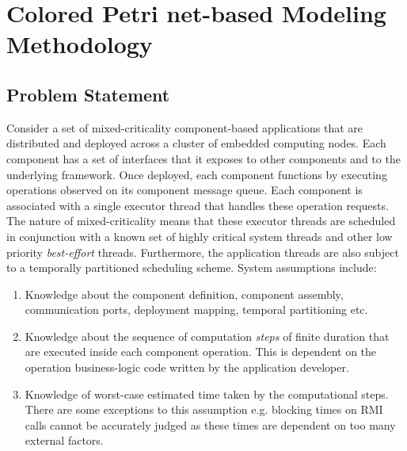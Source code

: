 \chapter{Colored Petri net-based Modeling Methodology}
\label{chapter:modeling}

\section{Problem Statement}

Consider a set of mixed-criticality component-based applications that are distributed and deployed across a cluster of embedded computing nodes. Each component has a set of interfaces that it exposes to other components and to the underlying framework. Once deployed, each component functions by executing operations observed on its component message queue. Each component is associated with a single executor thread that handles these operation requests. The nature of mixed-criticality means that these executor threads are scheduled in conjunction with a known set of highly critical system threads and other low priority \emph{best-effort} threads. Furthermore, the application threads are also subject to a temporally partitioned scheduling scheme. System assumptions include:

\begin{enumerate}
	\item Knowledge about the component definition, component assembly, communication ports, deployment mapping, temporal partitioning etc. 
	
	\item Knowledge about the sequence of computation \emph{steps} of finite duration that are executed inside each component operation. This is dependent on the operation business-logic code written by the application developer.
	
	\item Knowledge of worst-case estimated time taken by the computational steps. There are some exceptions to this assumption e.g. blocking times on RMI calls cannot be accurately judged as these times are dependent on too many external factors.
\end{enumerate}

